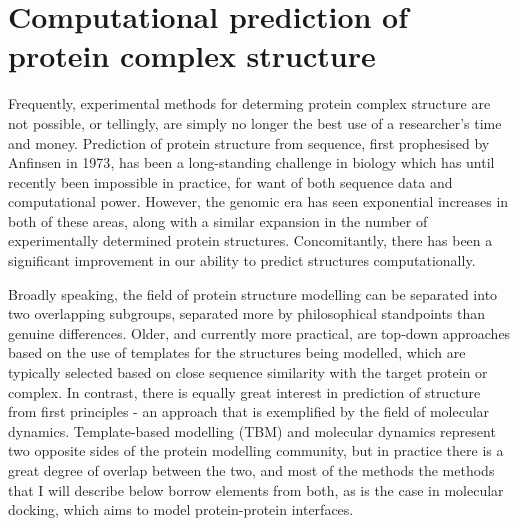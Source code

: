 \documentclass[a4paper,11pt,twoside,openright]{scrbook}
\begin{document}
\clearpage
\section{Computational prediction of protein complex structure}
Frequently, experimental methods for determing protein complex structure are not possible, or tellingly, are simply no longer the best use of a researcher's time and money. Prediction of protein structure from sequence, first prophesised by Anfinsen in 1973\cite{Anfinsen1973}, has been a long-standing challenge in biology which has until recently been impossible in practice, for want of both sequence data and computational power. However, the genomic era has seen exponential increases in both of these areas, along with a similar expansion in the number of experimentally determined protein structures. Concomitantly, there has been a significant improvement in our ability to predict structures computationally.

Broadly speaking, the field of protein structure modelling can be separated into two overlapping subgroups, separated more by philosophical standpoints than genuine differences. Older, and currently more practical, are top-down approaches based on the use of templates for the structures being modelled,  which are typically selected based on close sequence similarity with the target protein or complex. In contrast, there is equally great interest in prediction of structure from first principles - an approach that is exemplified by the field of molecular dynamics. Template-based modelling (TBM) and molecular dynamics represent two opposite sides of the protein modelling community, but in practice there is a great degree of overlap between the two, and most of the methods the methods that I will describe below borrow elements from both, as is the case in molecular docking, which aims to model protein-protein interfaces.
%
\end{document}
